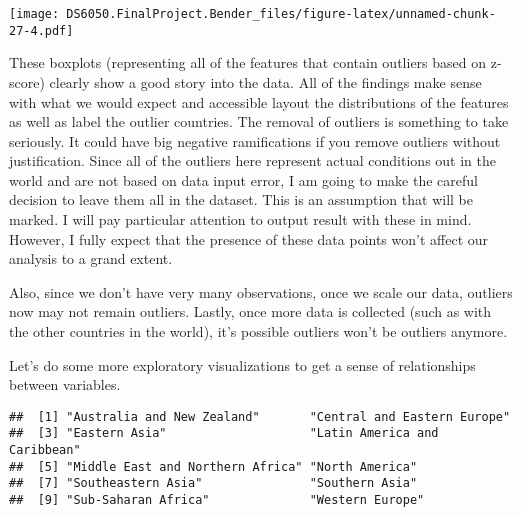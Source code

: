 \documentclass[]{article}
\newenvironment{Shaded}{\begin{snugshade}}{\end{snugshade}}
\newcommand{\CommentTok}[1]{\textcolor[rgb]{0.56,0.35,0.01}{\textit{#1}}}
\newcommand{\KeywordTok}[1]{\textcolor[rgb]{0.13,0.29,0.53}{\textbf{#1}}}
\newcommand{\NormalTok}[1]{#1}
\newcommand{\OperatorTok}[1]{\textcolor[rgb]{0.81,0.36,0.00}{\textbf{#1}}}
\newcommand{\StringTok}[1]{\textcolor[rgb]{0.31,0.60,0.02}{#1}}
\begin{document}
\texttt{[image: DS6050.FinalProject.Bender\_files/figure-latex/unnamed-chunk-27-4.pdf]}

These boxplots (representing all of the features that contain outliers
based on z-score) clearly show a good story into the data. All of the
findings make sense with what we would expect and accessible layout the
distributions of the features as well as label the outlier countries.
The removal of outliers is something to take seriously. It could have
big negative ramifications if you remove outliers without justification.
Since all of the outliers here represent actual conditions out in the
world and are not based on data input error, I am going to make the
careful decision to leave them all in the dataset. This is an assumption
that will be marked. I will pay particular attention to output result
with these in mind. However, I fully expect that the presence of these
data points won't affect our analysis to a grand extent.

Also, since we don't have very many observations, once we scale our
data, outliers now may not remain outliers. Lastly, once more data is
collected (such as with the other countries in the world), it's possible
outliers won't be outliers anymore.

Let's do some more exploratory visualizations to get a sense of
relationships between variables.

\begin{Shaded}
\end{Shaded}

\begin{verbatim}
##  [1] "Australia and New Zealand"       "Central and Eastern Europe"     
##  [3] "Eastern Asia"                    "Latin America and Caribbean"    
##  [5] "Middle East and Northern Africa" "North America"                  
##  [7] "Southeastern Asia"               "Southern Asia"                  
##  [9] "Sub-Saharan Africa"              "Western Europe"
\end{verbatim}
\end{document}
